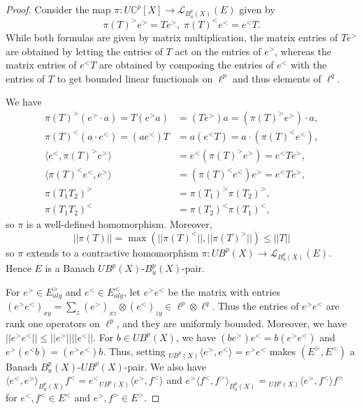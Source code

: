 \documentclass[a4,11pt]{amsart}
\theoremstyle{remark}
\begin{document}
\begin{proof}

Consider the map $\pi:U\mathbb{C}^p[X]\rightarrow\mathcal{L}_{B^p_u(X)}(E)$ given by
\[ \pi(T)^>e^>=Te^>,\; \pi(T)^<e^<=e^<T. \] 
While both formulas are given by matrix multiplication, the matrix entries of $Te^>$ are obtained by letting the entries of $T$ act on the entries of $e^>$, whereas the matrix entries of $e^<T$ are obtained by composing the entries of $e^<$ with the entries of $T$ to get bounded linear functionals on $\ell^p$ and thus elements of $\ell^q$.

We have 
\begin{align*}
\pi(T)^>(e^>\cdot a)=T(e^>a)&=(Te^>)a=(\pi(T)^>e^>)\cdot a, \\
\pi(T)^<(a\cdot e^<)=(ae^<)T&=a(e^<T)=a\cdot(\pi(T)^<e^<), \\
\langle e^<,\pi(T)^>e^> \rangle &= e^<(\pi(T)^>e^>)=e^<Te^>, \\
\langle \pi(T)^<e^<,e^> \rangle &=(\pi(T)^<e^<)e^>=e^<Te^>, \\
\pi(T_1T_2)^> &= \pi(T_1)^>\pi(T_2)^>, \\
\pi(T_1T_2)^< &= \pi(T_2)^<\pi(T_1)^<,
\end{align*}
so $\pi$ is a well-defined homomorphism.
Moreover, \[ ||\pi(T)||=\max(||\pi(T)^<||,||\pi(T)^>||)\leq||T|| \] 
so $\pi$ extends to a contractive homomorphism $\pi:UB^p(X)\rightarrow\mathcal{L}_{B^p_u(X)}(E)$.
Hence $E$ is a Banach $UB^p(X)$-$B^p_u(X)$-pair.

For $e^>\in E_{alg}^>$ and $e^<\in E_{alg}^<$, let $e^>e^<$ be the matrix with entries $(e^>e^<)_{xy}=\sum_z (e^>)_{xz}\otimes(e^<)_{zy}\in\ell^p\otimes\ell^q$.
Thus the entries of $e^>e^<$ are rank one operators on $\ell^p$, and they are uniformly bounded.
Moreover, we have $||e^>e^<||\leq||e^>||||e^<||$.
For $b\in UB^p(X)$, we have $(be^>)e^<=b(e^>e^<)$ and $e^>(e^<b)=(e^>e^<)b$.
Thus, setting ${_{UB^p(X)}}\langle e^>,e^< \rangle=e^>e^<$ makes $(E^>,E^<)$ a Banach $B^p_u(X)$-$UB^p(X)$-pair.
We also have $\langle e^<,e^> \rangle_{B^p_u(X)}f^<=e^<{_{UB^p(X)}}\langle e^>,f^< \rangle$ and $e^>\langle f^<,f^> \rangle_{B^p_u(X)}={_{UB^p(X)}}\langle e^>,f^< \rangle f^>$ for $e^<,f^<\in E^<$ and $e^>,f^>\in E^>$.


\end{proof}
\end{document}
